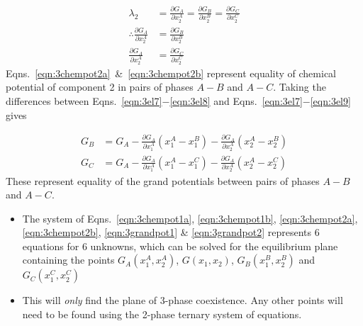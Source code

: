 \documentclass[10pt]{article}
\begin{document}
\begin{align}
  \lambda_2 &= \frac{\partial G_A}{\partial x_2^A} = \frac{\partial G_B}{\partial x_2^B} = \frac{\partial G_C}{\partial x_2^C}\\
  \label{eqn:3chempot2a}
  \therefore \frac{\partial G_A}{\partial x_2^A} &= \frac{\partial G_B}{\partial x_2^B}\\
  \label{eqn:3chempot2b}
             \frac{\partial G_A}{\partial x_2^A} &= \frac{\partial G_C}{\partial x_2^C}
\end{align}
Eqns.~\ref{eqn:3chempot2a}~\&~\ref{eqn:3chempot2b} represent equality of chemical potential of component 2
in pairs of phases $A-B$ and $A-C$. Taking the differences between Eqns.~\ref{eqn:3el7}$-$\ref{eqn:3el8}
and Eqns.~\ref{eqn:3el7}$-$\ref{eqn:3el9} gives

\begin{align}
  \label{eqn:3grandpot1}
  G_B &= G_A - \frac{\partial G_A}{\partial x_1^A}(x_1^A - x_1^B) - \frac{\partial G_A}{\partial x_2^A}(x_2^A - x_2^B)\\
  \label{eqn:3grandpot2}
  G_C &= G_A - \frac{\partial G_A}{\partial x_1^A}(x_1^A - x_1^C) - \frac{\partial G_A}{\partial x_2^A}(x_2^A - x_2^C)
\end{align}
These represent equality of the grand potentials between pairs of phases $A-B$ and $A-C$.

\begin{itemize}
  \item The system of Eqns.~\ref{eqn:3chempot1a}, \ref{eqn:3chempot1b},
        \ref{eqn:3chempot2a}, \ref{eqn:3chempot2b}, \ref{eqn:3grandpot1} \&
        \ref{eqn:3grandpot2} represents 6 equations for 6 unknowns, which can
        be solved for the equilibrium plane containing the points
        $G_A(x_1^A,x_2^A)$, $G(x_1,x_2)$, $G_B(x_1^B,x_2^B)$ and $G_C(x_1^C,x_2^C)$
  \item This will \emph{only} find the plane of 3-phase coexistence. Any other
        points will need to be found using the 2-phase ternary system of equations.      
\end{itemize}
\end{document}
